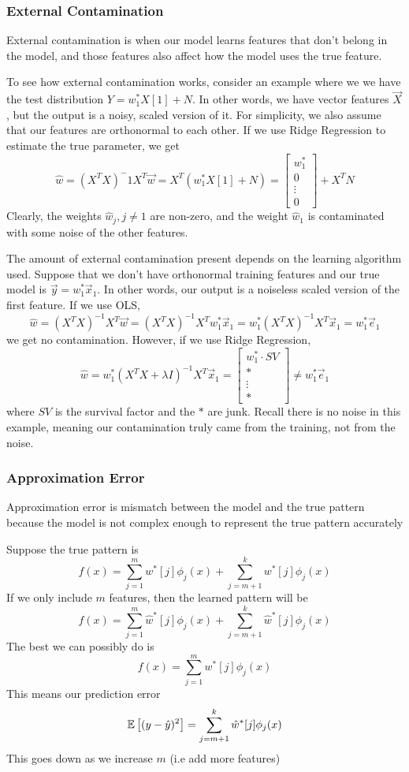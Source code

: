 \subsubsection{External Contamination}
\begin{definition}
  External contamination is when our model learns features that don't belong in the model, and those features also affect how the model uses the true feature.
\end{definition}
To see how external contamination works, consider an example where we we have the test distribution $Y=w_1^*X[1]+N$. In other words, we have vector features $\vec{X}$, but the output is a noisy, scaled version of it. For simplicity, we also assume that our features are orthonormal to each other.
If we use Ridge Regression to estimate the true parameter, we get
\[
  \hat{w} = (X^TX)^-1X^T\vec{w} = X^T(w^*_1X[1]+N) = \begin{bmatrix}
    w_1^*\\
    0\\
    \vdots\\
    0
  \end{bmatrix} + X^TN
\]
Clearly, the weights $\hat{w}_j, j\ne 1$ are non-zero, and the weight $\hat{w}_1$ is contaminated with some noise of the other features.

The amount of external contamination present depends on the learning algorithm used. Suppose that we don't have orthonormal training features and our true model is $\vec{y}=w_1^*\vec{x}_1$. In other words, our output is a noiseless scaled version of the first feature. If we use OLS,
\[
  \hat{w} = (X^TX)^{-1}X^T\vec{w}=(X^TX)^{-1}X^Tw_1^*\vec{x}_1=w_1^*(X^TX)^{-1}X^T\vec{x}_1 = w_1^*\vec{e}_1
\]
we get no contamination. However, if we use Ridge Regression,
\[
  \hat{w} = w_1^*(X^TX+\lambda I)^{-1}X^T\vec{x}_1 = \begin{bmatrix}
    w_1^* \cdot SV\\
    *\\
    \vdots\\
    *
  \end{bmatrix} \ne w_1^*\vec{e}_1
\] where $SV$ is the survival factor and the $*$ are junk. Recall there is no noise in this example, meaning our contamination truly came from the training, not from the noise.
\subsubsection{Approximation Error}
\begin{definition}
  Approximation error is mismatch between the model and the true pattern because the model is not complex enough to represent the true pattern accurately
\end{definition}
Suppose the true pattern is    
\[
  f(x) = \sum_{j=1}^mw^*[j]\phi_j(x)+\sum_{j=m+1}^kw^*[j]\phi_j(x)
\]
If we only include $m$ features, then the learned pattern will be 
  \[
    f(x) = \sum_{j=1}^m\hat{w}^*[j]\phi_j(x)+\sum_{j=m+1}^k\hat{w}^*[j]\phi_j(x)
  \]
  The best we can possibly do is
 \[ 
  f(x) = \sum_{j=1}^mw^*[j]\phi_j(x)
\]
This means our prediction error $$\mathbb{E}\left[(y-\hat{y})^2\right] = \sum_{j=m+1}^k\hat{w}^*[j]\phi_j(x)$$
This goes down as we increase $m$ (i.e add more features)
